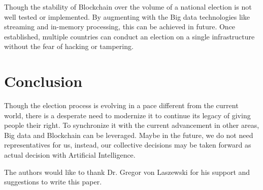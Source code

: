 \documentclass[sigconf]{acmart}
\begin{document}
Though the stability of Blockchain over the volume of a national election is not well tested or implemented. By augmenting with the Big data technologies like streaming and in-memory processing, this can be achieved in future. Once established, multiple countries can conduct an election on a single infrastructure without the fear of hacking or tampering.

\section{Conclusion}
Though the election process is evolving in a pace different from the current world, there is a desperate need to modernize it to continue its legacy of giving people their right. To synchronize it with the current advancement in other areas, Big data and Blockchain can be leveraged.
Maybe in the future, we do not need representatives for us, instead, our collective decisions may be taken forward as actual decision with Artificial Intelligence.

\begin{acks}

  The authors would like to thank Dr. Gregor von Laszewski for his
  support and suggestions to write this paper.
\end{acks}


 
\end{document}
